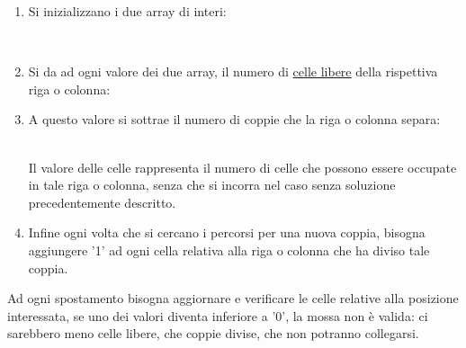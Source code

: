 \documentclass[11pt,a4paper,twocolumn]{IEEEtran}
\newcommand{\mysvg}[2]{}
\begin{document}
	\begin{enumerate}
		\item Si inizializzano i due array di interi:\\
		\begin{figure}[h]
			\vspace*{-.4cm}
			\centering
			\mysvg{expc/pcontrol1}{6}
		\end{figure}\\
		\vspace{-.5cm}
		\item Si da ad ogni valore dei due array, il numero di \underline{celle libere} della rispettiva riga o colonna:
		
		\begin{figure}[h]
			\vspace*{.0cm}
			\centering
			\mysvg{expc/pcontrol2}{6}
		\end{figure}
		\item A questo valore si sottrae il numero di coppie che la riga o colonna separa:
		\begin{figure}[h]
			\vspace*{.0cm}
			\centering
			\mysvg{expc/pcontrol3}{6}
		\end{figure}\\
		Il valore delle celle rappresenta il numero di celle che possono essere occupate in tale riga o colonna, senza che si incorra nel caso senza soluzione precedentemente descritto.\medskip\\
		\item Infine ogni volta che si cercano i percorsi per una nuova coppia, bisogna aggiungere '1' ad ogni cella relativa alla riga o colonna che ha diviso tale coppia.
	\end{enumerate}
	Ad ogni spostamento bisogna aggiornare e verificare le celle relative alla posizione interessata, se uno dei valori diventa inferiore a '0', la mossa  non è valida: ci sarebbero meno celle libere, che coppie divise, che non potranno collegarsi.
		
	\iftrue
\end{document}
